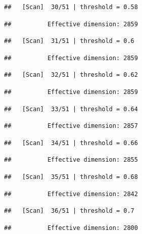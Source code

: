 \documentclass[
]{book}
\begin{document}
\begin{verbatim}
##   [Scan]  30/51 | threshold = 0.58
\end{verbatim}

\begin{verbatim}
##          Effective dimension: 2859
\end{verbatim}

\begin{verbatim}
##   [Scan]  31/51 | threshold = 0.6
\end{verbatim}

\begin{verbatim}
##          Effective dimension: 2859
\end{verbatim}

\begin{verbatim}
##   [Scan]  32/51 | threshold = 0.62
\end{verbatim}

\begin{verbatim}
##          Effective dimension: 2859
\end{verbatim}

\begin{verbatim}
##   [Scan]  33/51 | threshold = 0.64
\end{verbatim}

\begin{verbatim}
##          Effective dimension: 2857
\end{verbatim}

\begin{verbatim}
##   [Scan]  34/51 | threshold = 0.66
\end{verbatim}

\begin{verbatim}
##          Effective dimension: 2855
\end{verbatim}

\begin{verbatim}
##   [Scan]  35/51 | threshold = 0.68
\end{verbatim}

\begin{verbatim}
##          Effective dimension: 2842
\end{verbatim}

\begin{verbatim}
##   [Scan]  36/51 | threshold = 0.7
\end{verbatim}

\begin{verbatim}
##          Effective dimension: 2800
\end{verbatim}
\end{document}
